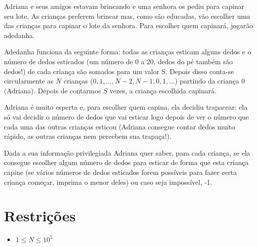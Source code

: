 Adriana e seus amigos estavam brincando e uma senhora os pediu para capinar seu lote. As crianças preferem brincar mas, como são educadas, vão escolher uma das crianças para capinar o lote da senhora. Para escolher quem capinará, jogarão adedanha.

Adedanha funciona da seguinte forma: todas as crianças esticam alguns dedos e o número de dedos esticados (um número de $0$ a $20$, dedos do pé também são dedos!) de cada criança são somados para um valor S. Depois disso conta-se circularmente as $N$ crianças ($0, 1, \ldots, N - 2, N - 1, 0, 1, \ldots$) partindo da criança $0$ (Adriana). Depois de contarmos $S$ vezes, a criança escolhida capinará.

Adriana é muito esperta e, para escolher quem capina, ela decidiu trapacear: ela só vai decidir o número de dedos que vai esticar logo depois de ver o número que cada uma das outras crianças esticou (Adriana consegue contar dedos muito rápido, as outras crianças nem percebem sua trapaça!).

Dada a sua informação privilegiada Adriana quer saber, para cada criança, se ela consegue escolher algum número de dedos para esticar de forma que esta criança capine (se vários números de dedos esticados forem possíveis para fazer certa criança começar, imprima o menor deles) ou caso seja impossível, -1.



\section*{Restrições}

\begin{itemize}
\item $1 \leq N \leq 10^5$
\end{itemize}

\sampleio